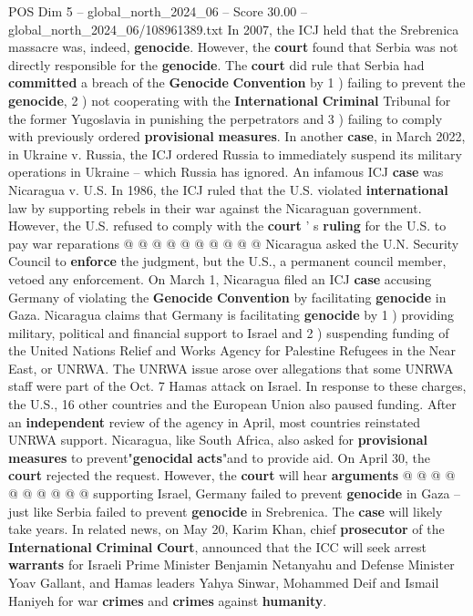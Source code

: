 \begin{textsample}{POS Dim 5 – global\_north\_2024\_06 – Score 30.00 – global\_north\_2024\_06/108961389.txt}
In 2007, the ICJ held that the Srebrenica massacre was, indeed, \textbf{genocide}.
However, the \textbf{court} found that Serbia was not directly responsible for the \textbf{genocide}.
The \textbf{court} did rule that Serbia had \textbf{committed} a breach of the \textbf{Genocide} \textbf{Convention} by 1 ) failing to prevent the \textbf{genocide}, 2 ) not cooperating with the \textbf{International} \textbf{Criminal} Tribunal for the former Yugoslavia in punishing the perpetrators and 3 ) failing to comply with previously ordered \textbf{provisional} \textbf{measures}.
In another \textbf{case}, in March 2022, in Ukraine v.
Russia, the ICJ ordered Russia to immediately suspend its military operations in Ukraine -- which Russia has ignored.
An infamous ICJ \textbf{case} was Nicaragua v.
U.S.
In 1986, the ICJ ruled that the U.S. violated \textbf{international} law by supporting rebels in their war against the Nicaraguan government.
However, the U.S. refused to comply with the \textbf{court} ' s \textbf{ruling} for the U.S. to pay war reparations @ @ @ @ @ @ @ @ @ @ Nicaragua asked the U.N.
Security Council to \textbf{enforce} the judgment, but the U.S., a permanent council member, vetoed any enforcement.
On March 1, Nicaragua filed an ICJ \textbf{case} accusing Germany of violating the \textbf{Genocide} \textbf{Convention} by facilitating \textbf{genocide} in Gaza.
Nicaragua claims that Germany is facilitating \textbf{genocide} by 1 ) providing military, political and financial support to Israel and 2 ) suspending funding of the United Nations Relief and Works Agency for Palestine Refugees in the Near East, or UNRWA.
The UNRWA issue arose over allegations that some UNRWA staff were part of the Oct. 7 Hamas attack on Israel.
In response to these charges, the U.S., 16 other countries and the European Union also paused funding.
After an \textbf{independent} review of the agency in April, most countries reinstated UNRWA support.
Nicaragua, like South Africa, also asked for \textbf{provisional} \textbf{measures} to prevent"\textbf{genocidal} \textbf{acts}"and to provide aid.
On April 30, the \textbf{court} rejected the request.
However, the \textbf{court} will hear \textbf{arguments} @ @ @ @ @ @ @ @ @ @ supporting Israel, Germany failed to prevent \textbf{genocide} in Gaza -- just like Serbia failed to prevent \textbf{genocide} in Srebrenica.
The \textbf{case} will likely take years.
In related news, on May 20, Karim Khan, chief \textbf{prosecutor} of the \textbf{International} \textbf{Criminal} \textbf{Court}, announced that the ICC will seek arrest \textbf{warrants} for Israeli Prime Minister Benjamin Netanyahu and Defense Minister Yoav Gallant, and Hamas leaders Yahya Sinwar, Mohammed Deif and Ismail Haniyeh for war \textbf{crimes} and \textbf{crimes} against \textbf{humanity}.

\end{textsample}
